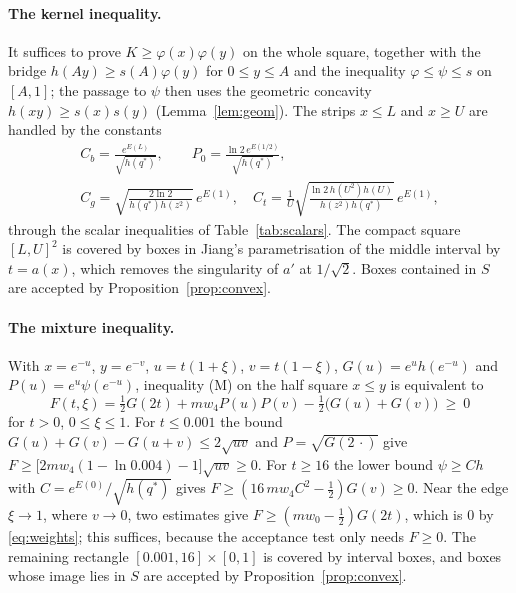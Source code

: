 \documentclass[12pt]{article}
\theoremstyle{plain}
\newcommand{\qs}{q^{*}}
\begin{document}
\paragraph*{The kernel inequality.} It suffices to prove $K\ge\varphi(x)\varphi(y)$ on the whole square, together with the bridge $h(Ay)\ge s(A)\varphi(y)$ for $0\le y\le A$ and the inequality $\varphi\le\psi\le s$ on $[A,1]$; the passage to $\psi$ then uses the geometric concavity $h(xy)\ge s(x)s(y)$ (Lemma~\ref{lem:geom}). The strips $x\le L$ and $x\ge U$ are handled by the constants
\begin{gather*}
C_b=\frac{e^{E(L)}}{\sqrt{h(\qs)}},\qquad P_0=\frac{\ln2\,e^{E(1/2)}}{\sqrt{h(\qs)}},\\
C_g=\sqrt{\frac{2\ln 2}{h(\qs)h(z^2)}}\,e^{E(1)},\quad C_t=\frac1U\sqrt{\frac{\ln2\,h(U^2)h(U)}{h(z^2)h(\qs)}}\,e^{E(1)},
\end{gather*}
through the scalar inequalities of Table~\ref{tab:scalars}. The compact square $[L,U]^2$ is covered by boxes in Jiang's parametrisation of the middle interval by $t=a(x)$, which removes the singularity of $a'$ at $1/\sqrt 2$. Boxes contained in $S$ are accepted by Proposition~\ref{prop:convex}.

\paragraph*{The mixture inequality.} With $x=e^{-u}$, $y=e^{-v}$, $u=t(1+\xi)$, $v=t(1-\xi)$, $G(u)=e^{u}h(e^{-u})$ and $P(u)=e^{u}\psi(e^{-u})$, inequality (M) on the half square $x\le y$ is equivalent to
\begin{equation}\label{eq:F}
F(t,\xi)=\tfrac12G(2t)+mw_4P(u)P(v)-\tfrac12\bigl(G(u)+G(v)\bigr)\ \ge\ 0
\end{equation}
for $t>0$, $0\le\xi\le1$. For $t\le 0.001$ the bound $G(u)+G(v)-G(u+v)\le 2\sqrt{uv}$ and $P=\sqrt{G(2\,\cdot)}$ give $F\ge\bigl[2mw_4(1-\ln 0.004)-1\bigr]\sqrt{uv}\ge0$. For $t\ge 16$ the lower bound $\psi\ge C h$ with $C=e^{E(0)}/\sqrt{h(\qs)}$ gives $F\ge(16\,mw_4C^2-\frac12)G(v)\ge0$. Near the edge $\xi\to 1$, where $v\to 0$, two estimates give $F\ge(mw_0-\frac12)G(2t)$, which is $0$ by \eqref{eq:weights}; this suffices, because the acceptance test only needs $F\ge 0$. The remaining rectangle $[0.001,16]\times[0,1]$ is covered by interval boxes, and boxes whose image lies in $S$ are accepted by Proposition~\ref{prop:convex}.
\end{document}
